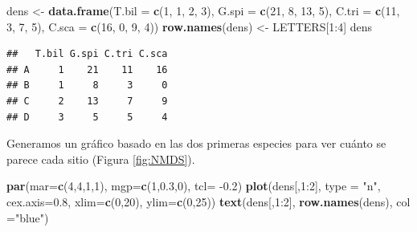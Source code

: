 \documentclass[]{book}
\newenvironment{Shaded}{\begin{snugshade}}{\end{snugshade}}
\newcommand{\KeywordTok}[1]{\textcolor[rgb]{0.13,0.29,0.53}{\textbf{{#1}}}}
\newcommand{\DataTypeTok}[1]{\textcolor[rgb]{0.13,0.29,0.53}{{#1}}}
\newcommand{\DecValTok}[1]{\textcolor[rgb]{0.00,0.00,0.81}{{#1}}}
\newcommand{\FloatTok}[1]{\textcolor[rgb]{0.00,0.00,0.81}{{#1}}}
\newcommand{\StringTok}[1]{\textcolor[rgb]{0.31,0.60,0.02}{{#1}}}
\newcommand{\NormalTok}[1]{{#1}}
\begin{document}
\begin{Shaded}
\begin{Highlighting}[]
\NormalTok{dens <-}\StringTok{ }\KeywordTok{data.frame}\NormalTok{(}\DataTypeTok{T.bil =} \KeywordTok{c}\NormalTok{(}\DecValTok{1}\NormalTok{, }\DecValTok{1}\NormalTok{, }\DecValTok{2}\NormalTok{, }\DecValTok{3}\NormalTok{), }\DataTypeTok{G.spi =} \KeywordTok{c}\NormalTok{(}\DecValTok{21}\NormalTok{, }\DecValTok{8}\NormalTok{, }\DecValTok{13}\NormalTok{, }\DecValTok{5}\NormalTok{),}
                   \DataTypeTok{C.tri =} \KeywordTok{c}\NormalTok{(}\DecValTok{11}\NormalTok{, }\DecValTok{3}\NormalTok{, }\DecValTok{7}\NormalTok{, }\DecValTok{5}\NormalTok{), }\DataTypeTok{C.sca =} \KeywordTok{c}\NormalTok{(}\DecValTok{16}\NormalTok{, }\DecValTok{0}\NormalTok{, }\DecValTok{9}\NormalTok{, }\DecValTok{4}\NormalTok{))}
\KeywordTok{row.names}\NormalTok{(dens) <-}\StringTok{ }\NormalTok{LETTERS[}\DecValTok{1}\NormalTok{:}\DecValTok{4}\NormalTok{]}
\NormalTok{dens}
\end{Highlighting}
\end{Shaded}

\begin{verbatim}
##   T.bil G.spi C.tri C.sca
## A     1    21    11    16
## B     1     8     3     0
## C     2    13     7     9
## D     3     5     5     4
\end{verbatim}

Generamos un gráfico basado en las dos primeras especies para ver cuánto
se parece cada sitio (Figura \ref{fig:NMDS}).

\begin{Shaded}
\begin{Highlighting}[]
\KeywordTok{par}\NormalTok{(}\DataTypeTok{mar=}\KeywordTok{c}\NormalTok{(}\DecValTok{4}\NormalTok{,}\DecValTok{4}\NormalTok{,}\DecValTok{1}\NormalTok{,}\DecValTok{1}\NormalTok{), }\DataTypeTok{mgp=}\KeywordTok{c}\NormalTok{(}\DecValTok{1}\NormalTok{,}\FloatTok{0.3}\NormalTok{,}\DecValTok{0}\NormalTok{), }\DataTypeTok{tcl=} \NormalTok{-}\FloatTok{0.2}\NormalTok{)}
\KeywordTok{plot}\NormalTok{(dens[,}\DecValTok{1}\NormalTok{:}\DecValTok{2}\NormalTok{], }\DataTypeTok{type =} \StringTok{"n"}\NormalTok{, }\DataTypeTok{cex.axis=}\FloatTok{0.8}\NormalTok{, }\DataTypeTok{xlim=}\KeywordTok{c}\NormalTok{(}\DecValTok{0}\NormalTok{,}\DecValTok{20}\NormalTok{), }\DataTypeTok{ylim=}\KeywordTok{c}\NormalTok{(}\DecValTok{0}\NormalTok{,}\DecValTok{25}\NormalTok{)) }
\KeywordTok{text}\NormalTok{(dens[,}\DecValTok{1}\NormalTok{:}\DecValTok{2}\NormalTok{], }\KeywordTok{row.names}\NormalTok{(dens), }\DataTypeTok{col =}\StringTok{"blue"}\NormalTok{)}
\end{Highlighting}
\end{Shaded}
\end{document}
